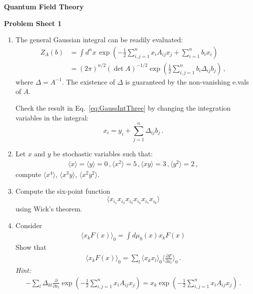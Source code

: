 \documentclass[12pt,a4paper]{article}
\begin{document}
\begin{center}
\textbf{ Quantum Field Theory}\\[\baselineskip]
\end{center}
\textbf{ Problem Sheet 1}

\begin{enumerate}

\item The general Gaussian integral can be readily evaluated:
  \begin{align}
    Z_A(b) &= \int d^nx\, \exp\left(
             -\frac12 \sum_{i,j=1}^n x_i A_{ij} x_j
             + \sum_{i=1}^n b_i x_i
             \right) \\
    \label{eq:GaussIntThree}
           &=  \left(2\pi\right)^{n/2} \left(\det A \right)^{-1/2}
             \exp\left(
             \frac12 \sum_{i,j=1}^n b_i \Delta_{ij} b_j
             \right) \, ,
  \end{align}
  where $\Delta = A^{-1}$. The existence of $\Delta$ is guaranteed by
  the non-vanishing e.vals of $A$.

  Check the result in Eq.~\ref{eq:GaussIntThree} by changing the
  integration variables in the integral:
  \[
    x_i = y_i + \sum_{j=1}^n \Delta_{ij} b_j\, .
  \]

\item Let $x$ and $y$ be stochastic variables such that:
  \begin{align*}
    \langle x \rangle = \langle y \rangle =0\, ,
    \langle x^2 \rangle = 5\, ,
    \langle x y \rangle = 3 \, ,
    \langle y^2 \rangle = 2\, ,
  \end{align*}
  compute $\langle x^4\rangle$, $\langle x^3 y \rangle$, $\langle x^2
  y^2\rangle$.  

\item Compute the six-point function
  \[
    \langle x_{i_1} x_{i_2} x_{i_3} x_{i_4} x_{i_5} x_{i_6} \rangle    
  \]
  using Wick's theorem. 

\item Consider 
  \begin{align}
    \langle x_k F(x) \rangle_0 = 
    \int d\mu_0(x) x_k F(x) 
  \end{align}
  Show that
  \begin{align}
    \langle x_k F(x) \rangle_0  = 
    \sum_l \langle x_k x_l \rangle_0 \langle \frac{\partial F}{\partial x_l}\rangle_0\, .
  \end{align}
  {\em Hint:} 
  \begin{align}
    - \sum_l \Delta_{kl} \frac{\partial}{\partial x_l}
    \exp\left(
    -\frac12 \sum_{i,j=1}^n x_i A_{ij} x_j
    \right) = 
    x_k \exp\left(
    -\frac12 \sum_{i,j=1}^n x_i A_{ij} x_j
    \right)\, .
  \end{align}


\end{enumerate}
\end{document}
